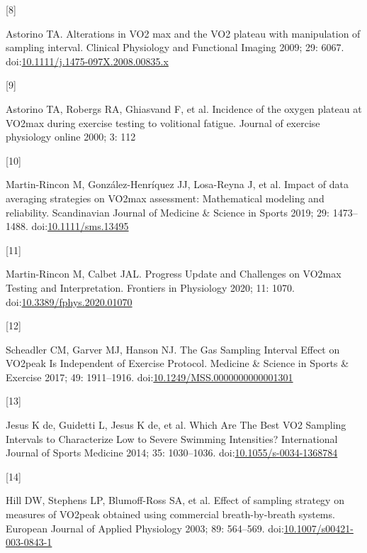 \documentclass[
  letterpaper,
  DIV=11,
  numbers=noendperiod]{scrartcl}
\newlength{\cslhangindent}
\newlength{\csllabelwidth}
\newenvironment{CSLReferences}[2] %
 {\begin{list}{}{%
  \setlength{\itemindent}{0pt}
  \setlength{\leftmargin}{0pt}
  \setlength{\parsep}{0pt}
  \ifodd #1
   \setlength{\leftmargin}{\cslhangindent}
   \setlength{\itemindent}{-1\cslhangindent}
  \fi
  \setlength{\itemsep}{#2\baselineskip}}}
 {\end{list}}
\newcommand{\CSLLeftMargin}[1]{\parbox[t]{\csllabelwidth}{\strut#1\strut}}
\newcommand{\CSLRightInline}[1]{\parbox[t]{\linewidth - \csllabelwidth}{\strut#1\strut}}
\begin{document}
\begin{CSLReferences}{0}{1}
\CSLLeftMargin{{[}8{]} }%
\CSLRightInline{Astorino TA. Alterations in VO2 max and the VO2 plateau
with manipulation of sampling interval. Clinical Physiology and
Functional Imaging 2009; 29: 6067.
doi:\href{https://doi.org/10.1111/j.1475-097X.2008.00835.x}{10.1111/j.1475-097X.2008.00835.x}}

\CSLLeftMargin{{[}9{]} }%
\CSLRightInline{Astorino TA, Robergs RA, Ghiasvand F, et al. Incidence
of the oxygen plateau at VO2max during exercise testing to volitional
fatigue. Journal of exercise physiology online 2000; 3: 112}

\CSLLeftMargin{{[}10{]} }%
\CSLRightInline{Martin-Rincon M, González-Henríquez JJ, Losa-Reyna J, et
al. Impact of data averaging strategies on VȮ2max assessment:
Mathematical modeling and reliability. Scandinavian Journal of Medicine
\& Science in Sports 2019; 29: 1473--1488.
doi:\href{https://doi.org/10.1111/sms.13495}{10.1111/sms.13495}}

\CSLLeftMargin{{[}11{]} }%
\CSLRightInline{Martin-Rincon M, Calbet JAL. Progress Update and
Challenges on VO2max Testing and Interpretation. Frontiers in Physiology
2020; 11: 1070.
doi:\href{https://doi.org/10.3389/fphys.2020.01070}{10.3389/fphys.2020.01070}}

\CSLLeftMargin{{[}12{]} }%
\CSLRightInline{Scheadler CM, Garver MJ, Hanson NJ. The Gas Sampling
Interval Effect on V{\textperiodcentered}O2peak Is Independent of
Exercise Protocol. Medicine \& Science in Sports \& Exercise 2017; 49:
1911--1916.
doi:\href{https://doi.org/10.1249/MSS.0000000000001301}{10.1249/MSS.0000000000001301}}

\CSLLeftMargin{{[}13{]} }%
\CSLRightInline{Jesus K de, Guidetti L, Jesus K de, et al. Which Are The
Best VO2 Sampling Intervals to Characterize Low to Severe Swimming
Intensities? International Journal of Sports Medicine 2014; 35:
1030--1036.
doi:\href{https://doi.org/10.1055/s-0034-1368784}{10.1055/s-0034-1368784}}

\CSLLeftMargin{{[}14{]} }%
\CSLRightInline{Hill DW, Stephens LP, Blumoff-Ross SA, et al. Effect of
sampling strategy on measures of VO2peak obtained using commercial
breath-by-breath systems. European Journal of Applied Physiology 2003;
89: 564--569.
doi:\href{https://doi.org/10.1007/s00421-003-0843-1}{10.1007/s00421-003-0843-1}}


\end{CSLReferences}
\end{document}
